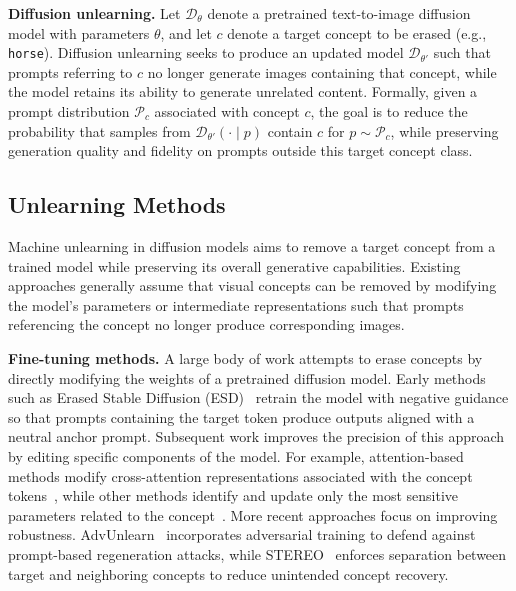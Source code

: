 \textbf{Diffusion unlearning.}
Let $\mathcal{D}_\theta$ denote a pretrained text-to-image diffusion model with parameters $\theta$, and let $c$ denote a target concept to be erased (e.g., \texttt{horse}).
Diffusion unlearning seeks to produce an updated model $\mathcal{D}_{\theta'}$ such that prompts referring to $c$ no longer generate images containing that concept, while the model retains its ability to generate unrelated content.
Formally, given a prompt distribution $\mathcal{P}_c$ associated with concept $c$, the goal is to reduce the probability that samples from $\mathcal{D}_{\theta'}(\cdot \mid p)$ contain $c$ for $p \sim \mathcal{P}_c$, while preserving generation quality and fidelity on prompts outside this target concept class.

\subsection{Unlearning Methods}
Machine unlearning in diffusion models aims to remove a target concept from a trained model while preserving its overall generative capabilities. Existing approaches generally assume that visual concepts can be removed by modifying the model’s parameters or intermediate representations such that prompts referencing the concept no longer produce corresponding images.

\textbf{Fine-tuning methods.}
A large body of work attempts to erase concepts by directly modifying the weights of a pretrained diffusion model. 
Early methods such as Erased Stable Diffusion (ESD)~\cite{gandikota2023erasing} retrain the model with negative guidance so that prompts containing the target token produce outputs aligned with a neutral anchor prompt. 
Subsequent work improves the precision of this approach by editing specific components of the model. 
For example, attention-based methods modify cross-attention representations associated with the concept tokens~\cite{wang2025ace}, while other methods identify and update only the most sensitive parameters related to the concept~\cite{fan2023salun,wu2024scissorhands}. 
More recent approaches focus on improving robustness. 
AdvUnlearn~\cite{zhang2024defensive} incorporates adversarial training to defend against prompt-based regeneration attacks, while STEREO~\cite{srivatsan2025stereo} enforces separation between target and neighboring concepts to reduce unintended concept recovery.

